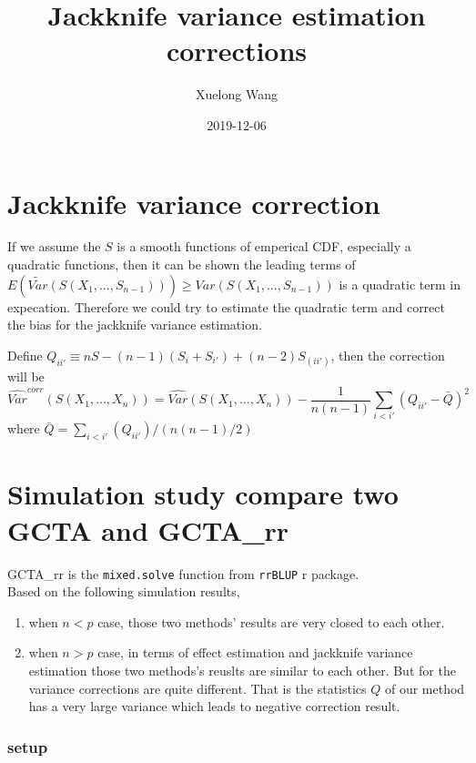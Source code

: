 \documentclass[]{article}
\title{Jackknife variance estimation corrections}
\author{Xuelong Wang}
\date{2019-12-06}
\providecommand{\tightlist}{%
  \setlength{\itemsep}{0pt}\setlength{\parskip}{0pt}}
\begin{document}
\maketitle

{
\setcounter{tocdepth}{2}
\tableofcontents
}
\section{Jackknife variance
correction}\label{jackknife-variance-correction}

If we assume the \(S\) is a smooth functions of emperical CDF,
especially a quadratic functions, then it can be shown the leading terms
of
\(E(\tilde{Var}(S(X_1, \dots, S_{n-1}))) \geq Var(S(X_1, \dots, S_{n-1}))\)
is a quadratic term in expecation. Therefore we could try to estimate
the quadratic term and correct the bias for the jackknife variance
estimation.

Define \(Q_{ii'} \equiv nS - (n-1)(S_{i} + S_{i'}) + (n-2)S_{(ii')}\),
then the correction will be \[
\hat{Var}^{corr}(S(X_1, \dots, X_n)) = \hat{Var}(S(X_1, \dots, X_n)) - \frac{1}{n(n-1)}\sum_{i < i'}(Q_{ii'}- \bar{Q})^2
\] where \(\bar{Q} = \sum_{i < i'}(Q_{ii'})/(n(n-1)/2)\)

\section{Simulation study compare two GCTA and
GCTA\_rr}\label{simulation-study-compare-two-gcta-and-gcta_rr}

GCTA\_rr is the \texttt{mixed.solve} function from \texttt{rrBLUP} r
package.\\
Based on the following simulation results,

\begin{enumerate}
\def\labelenumi{\arabic{enumi}.}
\tightlist
\item
  when \(n<p\) case, those two methods' results are very closed to each
  other.
\item
  when \(n>p\) case, in terms of effect estimation and jackknife
  variance estimation those two methods's reuslts are similar to each
  other. But for the variance corrections are quite different. That is
  the statistics \(Q\) of our method has a very large variance which
  leads to negative correction result.
\end{enumerate}

\subsubsection{setup}\label{setup}
\end{document}
